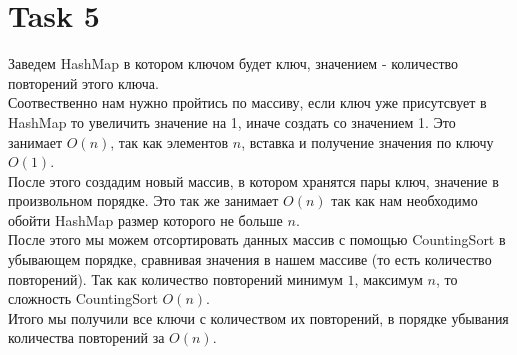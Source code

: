 \documentclass[12pt]{exam}
\begin{document}
\section*{Task 5}
Заведем HashMap в котором ключом будет ключ, значением - количество повторений этого ключа. \\
Соотвественно нам нужно пройтись по массиву, если ключ уже присутсвует в HashMap то увеличить значение на 1,
иначе создать со значением 1. Это занимает $O(n)$, так как элементов $n$, вставка и получение значения по ключу $O(1)$.\\
После этого создадим новый массив, в котором хранятся пары ключ, значение в произвольном порядке. 
Это так же занимает $O(n)$ так как нам необходимо обойти HashMap размер которого не больше $n$.\\
После этого мы можем отсортировать данных массив с помощью CountingSort в убывающем порядке, 
сравнивая значения в нашем массиве (то есть количество повторений). 
Так как количество повторений минимум $1$, максимум $n$, то сложность CountingSort $O(n)$.\\
Итого мы получили все ключи с количеством их повторений, в порядке убывания количества повторений за $O(n)$.
\end{document}
